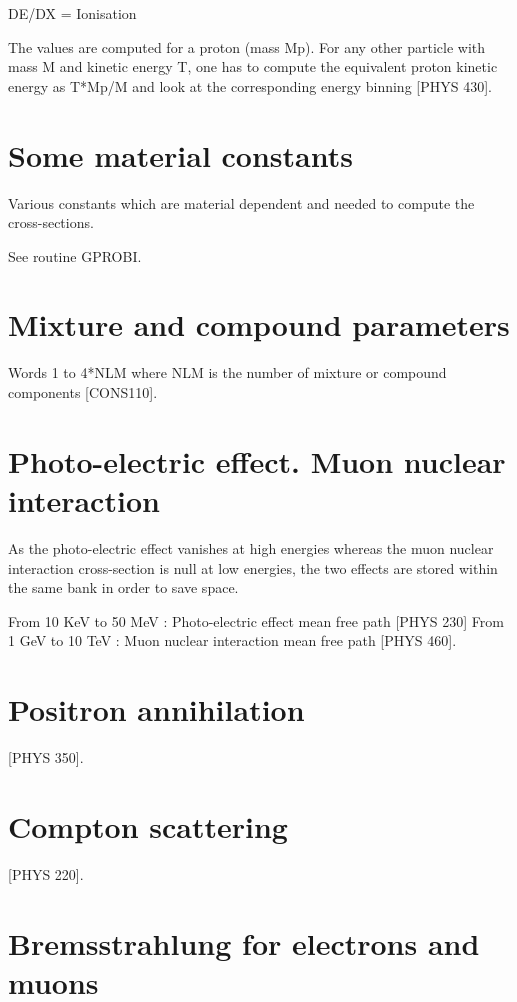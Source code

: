   DE/DX = Ionisation
 
The values are computed for a proton (mass Mp). For any other
particle with mass M and kinetic energy T,
one has to compute the equivalent proton kinetic energy as T*Mp/M
and look at the corresponding energy binning [PHYS 430].
 
\section{Some material constants}
 
Various constants which are material dependent and needed to compute the
cross-sections.
 
See routine GPROBI.
 
\section{Mixture and compound parameters}
 
Words 1 to 4*NLM  where  NLM is the number of mixture or compound
components [CONS110].
 
\section{Photo-electric effect. Muon nuclear interaction}
 
As the photo-electric effect vanishes at high energies
whereas the muon nuclear
interaction cross-section is null at low energies, the two effects are
stored within the same bank in order to save space.
 
From 10 KeV to 50 MeV : Photo-electric effect mean free path [PHYS 230]
From 1 GeV to 10 TeV : Muon nuclear interaction mean free path
[PHYS 460].
 
\section{Positron annihilation}
 
[PHYS 350].
 
\section{Compton scattering}
 
[PHYS 220].
 
\section{Bremsstrahlung for electrons and muons}
 
